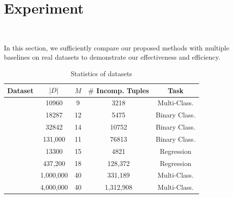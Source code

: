 
\section{Experiment}~\label{sec:exp}


In this section, we sufficiently compare our proposed methods with multiple baselines on real datasets to demonstrate our effectiveness and efficiency. 

\begin{table}
	\centering
	\caption{Statistics of datasets}
	\vspace{-1em}
	{\small
	\begin{tabular}{ccccc}
		\hline
		{\bf Dataset} & {\bf $|D|$} & {\bf $M$} & {\bf $\#$ Incomp. Tuples} & {\bf Task}\\
		\hline	
		\nursery & 	10960 & 9 & 3218 & Multi-Class. \\
		\hr & 18287 & 12 & 5475 & Binary Class. \\
		\adult & 32842 & 14 & 10752 & Binary Class. \\
		\credit & 131,000 & 11 & 76813 & Binary Class. \\
		\bike & 13300 & 15 & 4821 & Regression \\
		\air & 437,200  & 18 & 128,372 & Regression\\
		\imdb & 1,000,000 & 40 & 331,189 & Multi-Class.\\
		\imdbl & 4,000,000 & 40 & 1,312,908 & Multi-Class.\\
		\hline
	\end{tabular}
	}
	\label{tbl:dataset}
\end{table}



